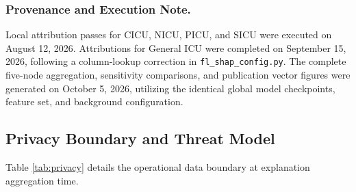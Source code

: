 \documentclass[conference,a4paper]{IEEEtran}
\begin{document}
\subsubsection{Provenance and Execution Note.}
Local attribution passes for CICU, NICU, PICU, and SICU were executed on August 12, 2026. Attributions for General ICU were completed on September 15, 2026, following a column-lookup correction in \texttt{fl\_shap\_config.py}. The complete five-node aggregation, sensitivity comparisons, and publication vector figures were generated on October 5, 2026, utilizing the identical global model checkpoints, feature set, and background configuration.

\subsection{Privacy Boundary and Threat Model}
Table \ref{tab:privacy} details the operational data boundary at explanation aggregation time.

\begin{table}[t]
\caption{Operational data boundary at explanation aggregation time}
\label{tab:privacy}
\centering
\small
{}
\end{table}
\end{document}
